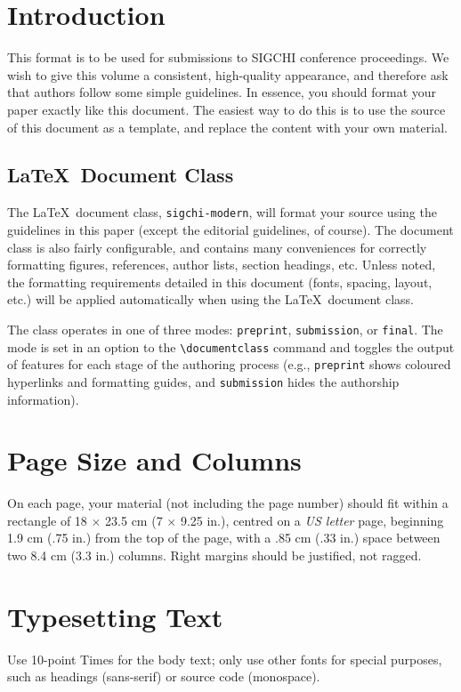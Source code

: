 \documentclass[preprint]{../latex/sigchi-modern}
\begin{document}
\section{Introduction}
This format is to be used for submissions to SIGCHI conference proceedings. We
wish to give this volume a consistent, high-quality appearance, and therefore
ask that authors follow some simple guidelines. In essence, you should format
your paper exactly like this document. The easiest way to do this is to use the
source of this document as a template, and replace the content with your own
material.

\subsection{\LaTeX\ Document Class}
The \LaTeX\ document class, \texttt{sigchi-modern}, will format your source
using the guidelines in this paper (except the editorial guidelines, of course).
The document class is also fairly configurable, and contains many conveniences
for correctly formatting figures, references, author lists, section headings,
etc. Unless noted, the formatting requirements detailed in this document (fonts,
spacing, layout, etc.) will be applied automatically when using the \LaTeX\ 
document class.

The class operates in one of three modes: \texttt{preprint},
\texttt{sub\-mis\-sion}, or \texttt{final}. The mode is set in an option to the
\texttt{\textbackslash documentclass} command and toggles the output of
features for each stage of the authoring process (e.g., \texttt{preprint} shows
coloured hyperlinks and formatting guides, and \texttt{submission} hides the
authorship information).

\section{Page Size and Columns}
On each page, your material (not including the page number) should fit within a
rectangle of 18 $\times$ 23.5 cm (7 $\times$ 9.25 in.), centred on a \textit{US
letter} page, beginning 1.9 cm (.75 in.) from the top of the page, with a .85 cm
(.33 in.) space between two 8.4 cm (3.3 in.) columns. Right margins should be
justified, not ragged.

\section{Typesetting Text}
Use 10-point Times for the body text; only use other fonts for special
purposes, such as headings (sans-serif) or source code (monospace).
\end{document}

